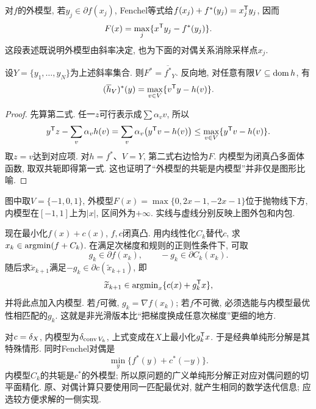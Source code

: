 对$f$的外模型, 若$y_j\in\partial f(x_j)$, Fenchel等式给$f(x_j)+f^*(y_j)=x_j^{\mathsf T} y_j$, 因而
\[
 F(x)=\max_j\{x^{\mathsf T} y_j-f^*(y_j)\}.
\]
这段表述既说明外模型由斜率决定, 也为下面的对偶关系消除采样点$x_j$.

\begin{proposition}\label{prop:inner-outer-conjugacy}
设$Y=\{y_1,\ldots,y_N\}$为上述斜率集合. 则$F^*=\overline{f^*}_Y$. 反向地, 对任意有限$V\subseteq\operatorname{dom} h$, 有
\[
 (\overline h_V)^*(y)=\max_{v\in V}\{v^{\mathsf T} y-h(v)\}.
\]
\end{proposition}
\begin{proof}
先算第二式. 任一$z$可行表示成$\sum\alpha_vv$, 所以
\[
 y^{\mathsf T} z-\sum_v\alpha_vh(v)=\sum_v\alpha_v\bigl(y^{\mathsf T} v-h(v)\bigr)
 \le\max_{v\in V}\{y^{\mathsf T} v-h(v)\}.
\]
取$z=v$达到对应项. 对$h=f^*$、$V=Y$, 第二式右边恰为$F$. 内模型为闭真凸多面体函数, 取双共轭即得第一式. 这也证明了“外模型的共轭是内模型”并非仅是图形比喻.
\end{proof}

\begin{center}
\end{center}
图中取$V=\{-1,0,1\}$, 外模型$F(x)=\max\{0,2x-1,-2x-1\}$位于抛物线下方, 内模型在$[-1,1]$上为$|x|$, 区间外为$+\infty$. 实线与虚线分别反映上图外包和内包.

现在最小化$f(x)+c(x)$, $f,c$闭真凸. 用内线性化$C_k$替代$c$, 求$x_k\in\operatorname{argmin}(f+C_k)$. 在满足次梯度和规则的正则性条件下, 可取
\[
 g_k\in\partial f(x_k),\qquad -g_k\in\partial C_k(x_k).
\]
随后求$\widetilde x_{k+1}$满足$-g_k\in\partial c(\widetilde x_{k+1})$, 即
\[
 \widetilde x_{k+1}\in\operatorname{argmin}_x\{c(x)+g_k^{\mathsf T} x\},
\]
并将此点加入内模型. 若$f$可微, $g_k=\nabla f(x_k)$; 若$f$不可微, 必须选能与内模型最优性相匹配的$g_k$. 这就是非光滑版本比“把梯度换成任意次梯度”更细的地方.

对$c=\delta_{X}$, 内模型为$\delta_{\operatorname{conv} V_k}$, 上式变成在$X$上最小化$g_k^{\mathsf T} x$. 于是经典单纯形分解是其特殊情形. 同时Fenchel对偶是
\[
 \min_y\{f^*(y)+c^*(-y)\}.
\]
内模型$C_k$的共轭是$c^*$的外模型; 所以原问题的广义单纯形分解正对应对偶问题的切平面精化. 原、对偶计算只要使用同一匹配最优对, 就产生相同的数学迭代信息; 应选较方便求解的一侧实现.

